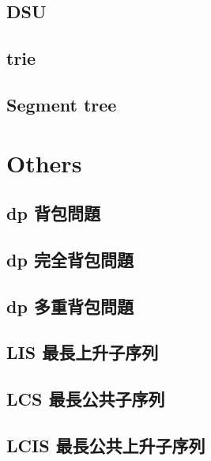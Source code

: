 \documentclass[a4paper,10pt,twocolumn,oneside]{article}
\begin{document}
\subsection{DSU}


\subsection{trie}


\subsection{Segment tree}


% 

\section{Others}

\subsection{dp 背包問題}


\subsection{dp 完全背包問題}


\subsection{dp 多重背包問題}


\subsection{LIS 最長上升子序列}


\subsection{LCS 最長公共子序列}


\subsection{LCIS 最長公共上升子序列}

\end{document}
